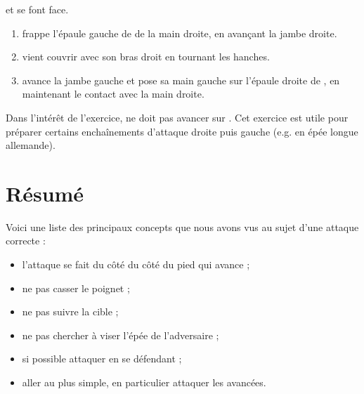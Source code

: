 \begin{exercice}
\label{struct:ex:frappe-gauche-droite}

\A et \D se font face.

\begin{enumerate}
	\item \A frappe l'épaule gauche de \D de la main droite, en avançant la jambe droite.
	\item \D vient couvrir avec son bras droit en tournant les hanches.
	\item \A avance la jambe gauche et pose sa main gauche sur l'épaule droite de \D, en maintenant le contact avec la main droite.
\end{enumerate}

Dans l'intérêt de l'exercice, \D ne doit pas avancer sur \A.
Cet exercice est utile pour préparer certains enchaînements d'attaque droite puis gauche (e.g.
en épée longue allemande).
\end{exercice}



\section{Résumé}


\noindent
Voici une liste des principaux concepts que nous avons vus au sujet d'une attaque correcte :
\begin{itemize}
	\item l'attaque se fait du côté du côté du pied qui avance ;
	\item ne pas casser le poignet ;
	\item ne pas suivre la cible ;
	\item ne pas chercher à viser l'épée de l'adversaire ;
	\item si possible attaquer en se défendant ;
	\item aller au plus simple, en particulier attaquer les avancées.
\end{itemize}

